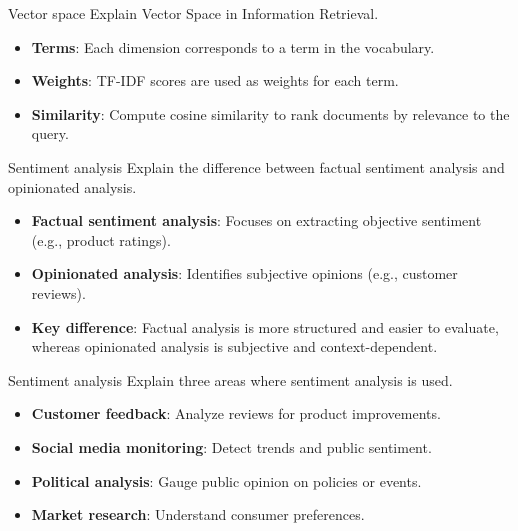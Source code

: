 \documentclass{article}
\begin{document}
\begin{exercise}{Vector space}
  Explain Vector Space in Information Retrieval.

  \begin{solution}
    \begin{itemize}
        \item \textbf{Terms}: Each dimension corresponds to a term in the vocabulary.
        \item \textbf{Weights}: TF-IDF scores are used as weights for each term.
        \item \textbf{Similarity}: Compute cosine similarity to rank documents by relevance to the query.
    \end{itemize}
  \end{solution}
\end{exercise}

\begin{exercise}{Sentiment analysis}
  Explain the difference between factual sentiment analysis and opinionated analysis.

  \begin{solution}
    \begin{itemize}
        \item \textbf{Factual sentiment analysis}: Focuses on extracting objective sentiment (e.g., product ratings).
        \item \textbf{Opinionated analysis}: Identifies subjective opinions (e.g., customer reviews).
        \item \textbf{Key difference}: Factual analysis is more structured and easier to evaluate, whereas opinionated analysis is subjective and context-dependent.
    \end{itemize}
  \end{solution}
\end{exercise}

\begin{exercise}{Sentiment analysis}
  Explain three areas where sentiment analysis is used.

  \begin{solution}
    \begin{itemize}
        \item \textbf{Customer feedback}: Analyze reviews for product improvements.
        \item \textbf{Social media monitoring}: Detect trends and public sentiment.
        \item \textbf{Political analysis}: Gauge public opinion on policies or events.
        \item \textbf{Market research}: Understand consumer preferences.
    \end{itemize}
  \end{solution}
\end{exercise}
\end{document}
